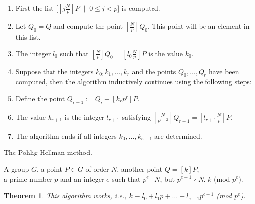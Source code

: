 \documentclass{article}
\numberwithin{equation}{section}
\newtheorem{theorem}{Theorem}[subsection]
\theoremstyle{definition}
\begin{document}
\begin{enumerate}
\item First the list $\big[ [j\frac{N}{p}]P \; \mid \; 0 \leq j < p\big]$ is computed. 
\item Let $Q_0=Q$ and compute the point $[\frac{N}{p}]Q_0$. This point will be an element in this list.
\item The integer $l_0$ such that $[\frac{N}{p}]Q_0=[l_0\frac{N}{p}]P$ is the value $k_0$.
\item Suppose that the integers $k_0,k_1,\ldots,k_r$ and the points $Q_0,\ldots,Q_r$ have been computed, then the algorithm inductively continues using the following steps:
\item Define the point $Q_{r+1}:=Q_r-[k_{r}p^r]P$.
\item The value $k_{r+1}$ is the integer $l_{r+1}$ satisfying $[\frac{N}{p^{r+2}}]Q_{r+1}=[l_{r+1}\frac{N}{p}]P$.
\item The algorithm ends if all integers $k_0,\ldots,k_{e-1}$ are determined. 
\end{enumerate}\newpage

\begin{algorithm}
\caption{The Pohlig-Hellman method.}
\begin{algorithmic}[1]\label{PH}
  \normalsize
  \REQUIRE A group $G$, a point $P \in G$ of order $N$, another point $Q = [k]P$,\\ a prime number $p$ and an integer $e$ such that $p^e \mid N$, but $p^{e+1} \nmid N$. 
  \ENSURE $k$ (mod $p^e$).
  \ENDFOR
\end{algorithmic}
\end{algorithm}

\begin{theorem}
This algorithm works, i.e., $k \equiv l_0+l_1p+\ldots+l_{e-1}p^{e-1}$ (mod $p^e$).
\end{theorem}
\end{document}
